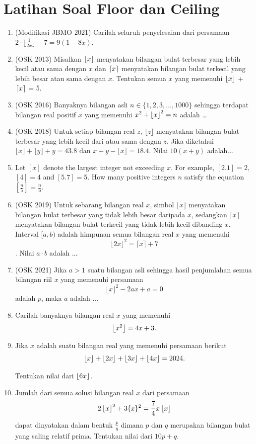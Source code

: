 \documentclass[a4paper]{article}
\begin{document}
\section{Latihan Soal Floor dan Ceiling}
\begin{enumerate}
    \item (Modifikasi JBMO 2021) Carilah seluruh penyelesaian dari persamaan $2\cdot \lfloor{\frac{1}{2x}}\rfloor - 7 = 9(1 - 8x)$.

    \item (OSK 2013) Misalkan $\left\lfloor x \right\rfloor$ menyatakan bilangan bulat terbesar yang lebih kecil atau sama dengan $x$ dan $\left\lceil x \right\rceil$ menyatakan bilangan bulat terkecil yang lebih besar atau sama dengan $x$. Tentukan semua $x$ yang memenuhi $\left\lfloor x \right\rfloor$ + $\left\lceil x \right\rceil$ = 5.
    
    \item (OSK 2016) Banyaknya bilangan asli $n \in \{1,2,3,\dots,1000\}$ sehingga terdapat bilangan real positif $x$ yang memenuhi $x^2+\left\lfloor x \right\rfloor^2=n$ adalah \dots
    
    \item (OSK 2018) Untuk setiap bilangan real $z$, $\lfloor z \rfloor$ menyatakan bilangan bulat terbesar yang lebih kecil dari atau sama dengan $z$. Jika diketahui $\lfloor x \rfloor + \lfloor y \rfloor + y = 43.8$ dan $x + y - \lfloor x \rfloor = 18.4$. Nilai $10(x + y)$ adalah...
    
    \item Let $[x]$ denote the largest integer not exceeding $x$. For example, $[2.1]=2$, $[4]=4$ and $[5.7]=5$. How many positive integers $n$ satisfy the equation $\left[\frac{n}{5}\right]=\frac{n}{6}$.

    \item (OSK 2019) Untuk sebarang bilangan real $x$, simbol $\lfloor x \rfloor$ menyatakan bilangan bulat terbesar yang tidak lebih besar daripada $x$, sedangkan $\lceil x \rceil$ menyatakan bilangan bulat terkecil yang tidak lebih kecil dibanding $x$. Interval $[a, b)$ adalah himpunan semua bilangan real $x$ yang memenuhi
    $$\lfloor 2x \rfloor^2 = \lceil x \rceil + 7$$.
    Nilai $a \cdot b$ adalah ...

    \item (OSK 2021) Jika $a > 1$ suatu bilangan asli sehingga hasil penjumlahan semua bilangan riil $x$ yang memenuhi persamaan
    $$\lfloor x \rfloor^2 - 2ax + a = 0$$
    adalah $p$, maka $a$ adalah ...

    \item Carilah banyaknya bilangan real $x$ yang memenuhi
    $$\left\lfloor x^2 \right\rfloor=4x+3.$$

    \item Jika $x$ adalah suatu bilangan real yang memenuhi persamaan berikut
    $$\left\lfloor x \right\rfloor+\left\lfloor 2x \right\rfloor+\left\lfloor 3x \right\rfloor+\left\lfloor 4x \right\rfloor=2024.$$

    Tentukan nilai dari $\left\lfloor 6x \right\rfloor$.

    \item Jumlah dari semua solusi bilangan real $x$ dari persamaan
    $$2\left\lfloor x \right\rfloor^2+3\{x\}^2=\frac{7}{4}x\left\lfloor x \right\rfloor$$
    dapat dinyatakan dalam bentuk $\frac{p}{q}$ dimana $p$ dan $q$ merupakan bilangan bulat yang saling relatif prima. Tentukan nilai dari $10p+q$.
\end{enumerate}
\end{document}
